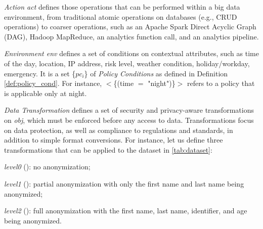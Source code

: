       \textit{Action act} defines those operations that can be performed within a big data environment, from traditional atomic operations on databases (e.g., CRUD operations) to coarser operations, such as an Apache Spark Direct Acyclic Graph (DAG), Hadoop MapReduce, an analytics function call, and an analytics pipeline.

      \textit{Environment env} defines a set of conditions on contextual attributes, such as time of the day, location, IP address, risk level, weather condition, holiday/workday, emergency. It is a set \{$pc_i$\} of \emph{Policy Conditions} as defined in Definition \ref{def:policy_cond}. For instance, $<$\{(time $=$ "night")\}$>$ refers to a policy that is applicable only at night.

      \textit{Data Transformation \TP} defines a set of security and privacy-aware transformations on \textit{obj}, which must be enforced before any access to data. Transformations focus on data protection, as well as compliance to regulations and standards, in addition to simple format conversions. For instance, let us define three transformations that can be applied to the dataset in \cref{tab:dataset}:
      \begin{enumerate*}[label=\roman*)]
        \item \emph{level0} (): no anonymization;
        \item \emph{level1} (): partial anonymization with only the first name and last name being anonymized;
        \item \emph{level2} (): full anonymization with the first name, last name, identifier, and age being anonymized.
      \end{enumerate*}


